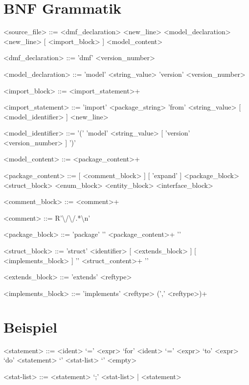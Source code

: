 \documentclass{article}
\begin{document}
\section{BNF Grammatik}
\setlength{\grammarparsep}{20pt plus 1pt minus 1pt} %
\setlength{\grammarindent}{12em} %

\begin{grammar}
<source_file> ::= <dmf_declaration> <new_line> <model_declaration> <new_line> [ <import_block> ] <model_content>

<dmf_declaration> ::= 'dmf' <version_number>


<model_declaration> ::= 'model' <string_value> 'version' <version_number>

<import_block> ::= <import_statement>+

<import_statement> ::= 'import' <package_string> 'from' <string_value> [ <model_identifier> ] <new_line>

<model_identifier> ::= '(' 'model' <string_value> [ 'version' <version_number> ] ')'


<model_content> ::= <package_content>+

<package_content> ::= [ <comment_block> ] [ 'expand' ] <package_block>
 <struct_block>
 <enum_block>
 <entity_block>
 <interface_block>

<comment_block> ::= <comment>+

<comment> ::= R'\textbackslash /\textbackslash /.*\textbackslash n'

<package_block> ::= 'package' '{' <package_content>+ '}'

<struct_block> ::= 'struct' <identifier> [ <extends_block> ] [ <implements_block> ] '{' <struct_content>+ '}'

<extends_block> ::= 'extends' <reftype>

<implements_block> ::= 'implements' <reftype> (',' <reftype>)+



\end{grammar}

\section{Beispiel}
\setlength{\grammarparsep}{20pt plus 1pt minus 1pt} %
\setlength{\grammarindent}{12em} %

\begin{grammar}
<statement> ::= <ident> `=' <expr> 
\alt `for' <ident> `=' <expr> `to' <expr> `do' <statement> 
\alt `{' <stat-list> `}' 
\alt <empty> 

<stat-list> ::= <statement> `;' <stat-list> | <statement> 

\end{grammar}
\end{document}
